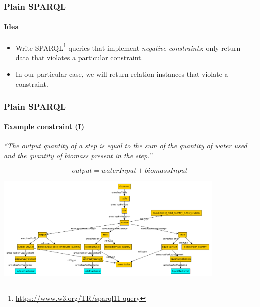 \documentclass{beamer}
\newcommand{\fnhref}[2]{\href{#2}{#1}\footnote{\url{#2}}}
\begin{document}
\begin{frame}
  \frametitle{Plain SPARQL}
  \framesubtitle{Idea}

  \begin{itemize}
    \item Write \fnhref{SPARQL}{https://www.w3.org/TR/sparql11-query} queries
      that implement \textit{negative constraints}: only return data that
      violates a particular constraint.

    \item In our particular case, we will return relation instances that
      violate a constraint.
  \end{itemize}
\end{frame}

\begin{frame}
  \frametitle{Plain SPARQL}
  \framesubtitle{Example constraint (I)}

  \vspace{0.5cm}

  \textit{``The output quantity of a step is equal to the sum of the quantity
  of water used and the quantity of biomass present in the step.''}

  $$output = waterInput + biomassInput$$

  \begin{center}
    \includegraphics[width=11cm]{underlying-graph.png}
  \end{center}
\end{frame}
\end{document}
